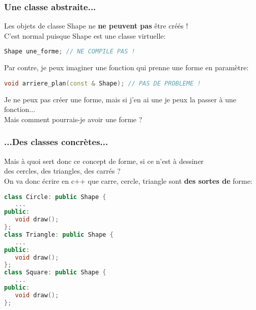 \documentclass{beamer}
\begin{document}
  \begin{frame}[fragile=singleslide,shrink=20]
  \frametitle{Une classe abstraite...}
  Les objets de classe Shape ne \textbf{ne peuvent pas} être créés ! \\
  C'est normal puisque Shape est une classe virtuelle: 

\begin{lstlisting}[language=c++]
Shape une_forme; // NE COMPILE PAS !
\end{lstlisting}

Par contre, je peux imaginer une fonction qui prenne une forme en paramètre:
\begin{lstlisting}[language=c++]
void arriere_plan(const & Shape); // PAS DE PROBLEME !
\end{lstlisting}

Je ne peux pas créer une forme, mais si j'en ai une je peux la passer à une fonction... \\
Mais comment pourrais-je avoir une forme ?

\end{frame}

  \begin{frame}[fragile=singleslide,shrink=20]
  \frametitle{...Des classes concrètes...}
  Mais à quoi sert donc ce concept de forme, si ce n'est à dessiner \\ 
  des cercles, des triangles, des carrés ? \\
  On va donc écrire en c++ que carre, cercle, triangle sont \textbf{des sortes de} forme:

\begin{lstlisting}[language=c++]
class Circle: public Shape {
   ...
public:
   void draw();
};
class Triangle: public Shape {
   ...
public:
   void draw();
};
class Square: public Shape {
   ...
public:
   void draw();
};
\end{lstlisting}

\end{frame}
\end{document}
